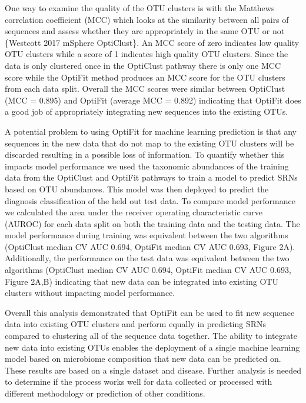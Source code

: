 \documentclass[
  11pt,
]{article}
\begin{document}
One way to examine the quality of the OTU clusters is with the Matthews
correlation coefficient (MCC) which looks at the similarity between all
pairs of sequences and assess whether they are appropriately in the same
OTU or not \{Westcott 2017 mSphere OptiClust\}. An MCC score of zero
indicates low quality OTU clusters while a score of 1 indicates high
quality OTU clusters. Since the data is only clustered once in the
OptiClust pathway there is only one MCC score while the OptiFit method
produces an MCC score for the OTU clusters from each data split. Overall
the MCC scores were similar between OptiClust (MCC = 0.895) and OptiFit
(average MCC = 0.892) indicating that OptiFit does a good job of
appropriately integrating new sequences into the existing OTUs.

A potential problem to using OptiFit for machine learning prediction is
that any sequences in the new data that do not map to the existing OTU
clusters will be discarded resulting in a possible loss of information.
To quantify whether this impacts model performance we used the taxonomic
abundances of the training data from the OptiClust and OptiFit pathways
to train a model to predict SRNs based on OTU abundances. This model was
then deployed to predict the diagnosis classification of the held out
test data. To compare model performance we calculated the area under the
receiver operating characteristic curve (AUROC) for each data split on
both the training data and the testing data. The model performance
during training was equivalent between the two algorithms (OptiClust
median CV AUC 0.694, OptiFit median CV AUC 0.693, Figure 2A).
Additionally, the performance on the test data was equivalent between
the two algorithms (OptiClust median CV AUC 0.694, OptiFit median CV AUC
0.693, Figure 2A,B) indicating that new data can be integrated into
existing OTU clusters without impacting model performance.

Overall this analysis demonstrated that OptiFit can be used to fit new
sequence data into existing OTU clusters and perform equally in
predicting SRNs compared to clustering all of the sequence data
together. The ability to integrate new data into existing OTUs enables
the deployment of a single machine learning model based on microbiome
composition that new data can be predicted on. These results are based
on a single dataset and disease. Further analysis is needed to determine
if the process works well for data collected or processed with different
methodology or prediction of other conditions.
\end{document}
